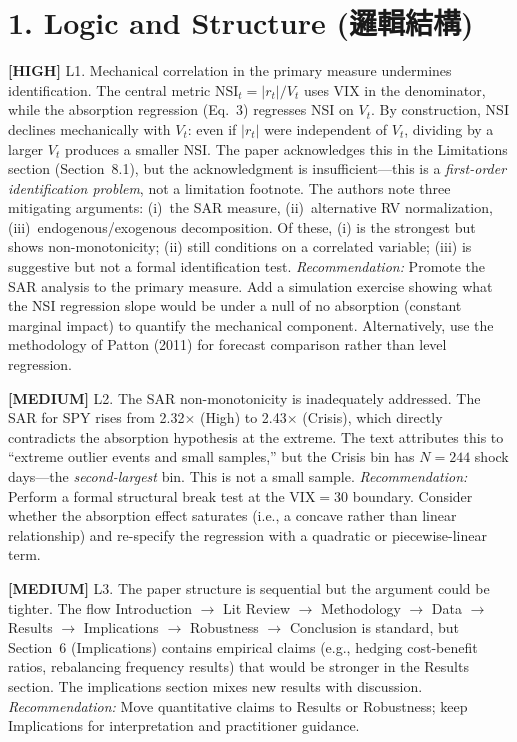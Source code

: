 \documentclass[12pt,a4paper]{article}
\newcommand{\high}[1]{\textcolor{errorred}{\textbf{[HIGH]} #1}}
\newcommand{\med}[1]{\textcolor{warncolor}{\textbf{[MEDIUM]} #1}}
\begin{document}
\section*{1. Logic and Structure (邏輯結構)}

\high{L1. Mechanical correlation in the primary measure undermines identification.} The central metric $\text{NSI}_t = |r_t| / V_t$ uses VIX in the denominator, while the absorption regression (Eq.~3) regresses NSI on $V_t$. By construction, NSI declines mechanically with $V_t$: even if $|r_t|$ were independent of $V_t$, dividing by a larger $V_t$ produces a smaller NSI. The paper acknowledges this in the Limitations section (Section~8.1), but the acknowledgment is insufficient---this is a \emph{first-order identification problem}, not a limitation footnote. The authors note three mitigating arguments: (i)~the SAR measure, (ii)~alternative RV normalization, (iii)~endogenous/exogenous decomposition. Of these, (i) is the strongest but shows non-monotonicity; (ii) still conditions on a correlated variable; (iii) is suggestive but not a formal identification test. \emph{Recommendation:} Promote the SAR analysis to the primary measure. Add a simulation exercise showing what the NSI regression slope would be under a null of no absorption (constant marginal impact) to quantify the mechanical component. Alternatively, use the methodology of Patton (2011) for forecast comparison rather than level regression.

\med{L2. The SAR non-monotonicity is inadequately addressed.} The SAR for SPY rises from 2.32$\times$ (High) to 2.43$\times$ (Crisis), which directly contradicts the absorption hypothesis at the extreme. The text attributes this to ``extreme outlier events and small samples,'' but the Crisis bin has $N=244$ shock days---the \emph{second-largest} bin. This is not a small sample. \emph{Recommendation:} Perform a formal structural break test at the VIX$=30$ boundary. Consider whether the absorption effect saturates (i.e., a concave rather than linear relationship) and re-specify the regression with a quadratic or piecewise-linear term.

\med{L3. The paper structure is sequential but the argument could be tighter.} The flow Introduction $\to$ Lit Review $\to$ Methodology $\to$ Data $\to$ Results $\to$ Implications $\to$ Robustness $\to$ Conclusion is standard, but Section~6 (Implications) contains empirical claims (e.g., hedging cost-benefit ratios, rebalancing frequency results) that would be stronger in the Results section. The implications section mixes new results with discussion. \emph{Recommendation:} Move quantitative claims to Results or Robustness; keep Implications for interpretation and practitioner guidance.
\end{document}
